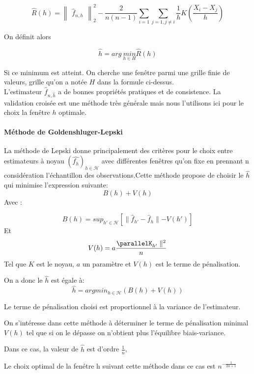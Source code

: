\documentclass[
]{article}
\begin{document}
\[
\hat{R}(h)=\begin{Vmatrix}\hat{f}_{n,h}\end{Vmatrix}_2^2-\frac{2}{n(n-1)}\sum_{i=1}\sum_{j=1,j\ne i}\frac{1}{h}K(\frac{X_i-X_j}{h})
\]

On définit alors

\[
\hat{h} = arg\ \underset{h\in H}{min}\hat{R}(h)
\]

Si ce minimum est atteint. On cherche une fenêtre parmi une grille finie
de valeurs, grille qu'on a notée \(H\) dans la formule ci-dessus.\\
L'estimateur \(\hat{f}_{n,\hat{h}}\) a de bonnes propriétés pratiques et
de consistence. La validation croisée est une méthode très générale mais
nous l'utilisons ici pour le choix la fenêtre \(h\) optimale.

\paragraph{Méthode de  Goldenshluger-Lepski}

La méthode de Lepski donne principalement des critères pour le choix
entre estimateurs à noyau \((\hat{f_h})_{h\in \mathcal H}\) avec
différentes fenêtres qu'on fixe en prennant n considération
l'échantillon des observations.\newline Cette méthode propose de choisir
le \(\hat h\) qui minimise l'expression suivante: \[
B(h)+V(h)
\] Avec :

\[
B(h)=sup_{h' \in \mathcal H}{[\parallel\hat f_{h'} - \hat f _h \parallel-V(h')]}
\] Et \[
V(h)=a \frac{\parallelK_{h'}\parallel^2}{n}
\] Tel que \(K\) est le noyau, \(a\) un paramètre et \(V(h)\) est le
terme de pénalisation.\newline

On a donc le \(\hat h\) est égale à: \[
\hat h = arg min_{h \in \mathcal H}(B(h)+V(h))
\]

\begin{remark}
Le terme de pénalisation choisi est proportionnel à la variance de l'estimateur.
\end{remark}

On s'intéresse dans cette méthode à déterminer le terme de pénalisation
minimal \(V(h)\) tel que si on le dépasse on n'obtient plus l'équilibre
biais-variance.\newline

Dans ce cas, la valeur de \(\hat h\) est d'ordre \(\frac{1}{n}\),

Le choix optimal de la fenétre h suivant cette méthode dans ce cas est
\(n^{-\frac{1}{2 \alpha +1}}\)
\end{document}
